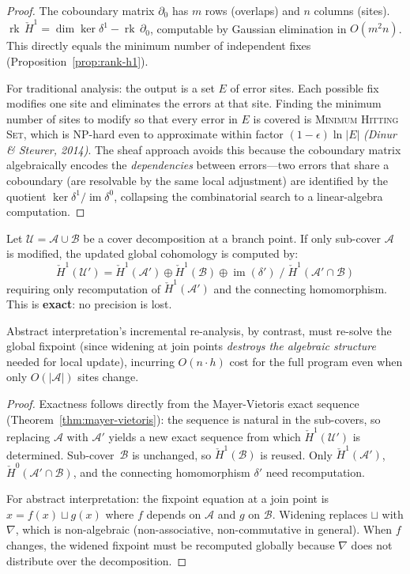 \documentclass[acmsmall,screen]{acmart}
\theoremstyle{remark}
\newcommand{\Hc}[1]{\check{H}^{#1}}
\newcommand{\rk}{\operatorname{rk}}
\newcommand{\im}{\operatorname{im}}
\begin{document}
\begin{proof}
The coboundary matrix $\partial_0$ has $m$ rows (overlaps) and $n$
columns (sites).  $\rk\,\Hc{1} = \dim\ker\delta^1 - \rk\,\partial_0$,
computable by Gaussian elimination in $O(m^2 n)$.  This directly equals
the minimum number of independent fixes (Proposition~\ref{prop:rank-h1}).

For traditional analysis: the output is a set $E$ of error sites.
Each possible fix modifies one site and eliminates the errors at that
site.  Finding the minimum number of sites to modify so that every
error in $E$ is covered is \textsc{Minimum Hitting Set}, which is
NP-hard even to approximate within factor $(1-\epsilon)\ln|E|$
\emph{(Dinur \& Steurer, 2014)}.  The sheaf approach avoids this
because the coboundary matrix algebraically encodes the
\emph{dependencies} between errors---two errors that share a
coboundary (are resolvable by the same local adjustment) are
identified by the quotient $\ker\delta^1 / \im\delta^0$, collapsing
the combinatorial search to a linear-algebra computation.
\end{proof}

\begin{theorem}\label{thm:incremental-exact}
Let $\mathcal{U} = \mathcal{A} \cup \mathcal{B}$ be a cover
decomposition at a branch point.  If only sub-cover $\mathcal{A}$ is
modified, the updated global cohomology is computed by:
\[
  \Hc{1}(\mathcal{U}') = \Hc{1}(\mathcal{A}') \oplus
  \Hc{1}(\mathcal{B}) \oplus \im(\delta')
  \;/\; \Hc{1}(\mathcal{A}' \cap \mathcal{B})
\]
requiring only recomputation of $\Hc{1}(\mathcal{A}')$ and the
connecting homomorphism.  This is \textbf{exact}: no precision is
lost.

Abstract interpretation's incremental re-analysis, by contrast, must
re-solve the global fixpoint (since widening at join points
\emph{destroys the algebraic structure} needed for local update),
incurring $O(n \cdot h)$ cost for the full program even when only
$O(|\mathcal{A}|)$ sites change.
\end{theorem}

\begin{proof}
Exactness follows directly from the Mayer-Vietoris exact sequence
(Theorem~\ref{thm:mayer-vietoris}): the sequence is natural in the
sub-covers, so replacing $\mathcal{A}$ with $\mathcal{A}'$ yields a
new exact sequence from which $\Hc{1}(\mathcal{U}')$ is determined.
Sub-cover~$\mathcal{B}$ is unchanged, so $\Hc{1}(\mathcal{B})$ is
reused.  Only $\Hc{1}(\mathcal{A}')$, $\Hc{0}(\mathcal{A}' \cap
\mathcal{B})$, and the connecting homomorphism $\delta'$ need
recomputation.

For abstract interpretation: the fixpoint equation at a join point
is $x = f(x) \sqcup g(x)$ where $f$ depends on $\mathcal{A}$ and
$g$ on $\mathcal{B}$.  Widening replaces $\sqcup$ with $\nabla$,
which is non-algebraic (non-associative, non-commutative in general).
When $f$ changes, the widened fixpoint must be recomputed globally
because $\nabla$ does not distribute over the decomposition.
\end{proof}
\end{document}
